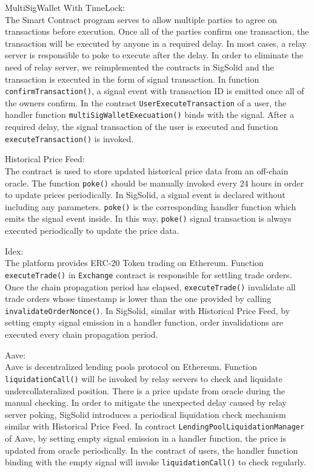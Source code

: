 \documentclass{article}
\newcommand{\sourcecode}[1]{\texttt{#1}}
\begin{document}
MultiSigWallet With TimeLock:\\
The Smart Contract program serves to allow multiple parties to agree on transactions before execution. 
Once all of the parties confirm one transaction, the transaction will be executed by anyone in a required delay.
In most cases, a relay server is responsible to poke to execute after the delay.
In order to eliminate the need of relay server, we reimplemented the contracts in SigSolid and the transaction is executed in the form of signal transaction.
In function \sourcecode{confirmTransaction()}, a signal event with transaction ID is emitted once all of the owners confirm.
In the contract \sourcecode{UserExecuteTransaction} of a user, the handler function \sourcecode{multiSigWalletExecuation()} binds with the signal.
After a required delay, the signal transaction of the user is executed and function \sourcecode{executeTransaction()} is invoked.

Historical Price Feed:\\
The contract is used to store updated historical price data from an off-chain oracle.
The function \sourcecode{poke()} should be manually invoked every 24 hours in order to update prices periodically.
In SigSolid, a signal event is declared without including any parameters. 
\sourcecode{poke()} is the corresponding handler function which emits the signal event inside.
In this way, \sourcecode{poke()} signal transaction is always executed periodically to update the price data.

Idex:\\
The platform provides ERC-20 Token trading on Ethereum. 
Function \sourcecode{executeTrade()} in \sourcecode{Exchange} contract is responsible for settling trade orders.
Once the chain propagation period has elapsed, \sourcecode{executeTrade()} invalidate all trade orders whose timestamp is lower than the one provided 
by calling \sourcecode{invalidateOrderNonce()}.
In SigSolid, similar with Historical Price Feed, 
by setting empty signal emission in a handler function, order invalidations are executed every chain propagation period.

Aave:\\
Aave is decentralized lending pools protocol on Ethereum. 
Function \sourcecode{liquidationCall()} will be invoked by relay servers
to check and liquidate undercollateralized position.
There is a price update from oracle during the manual checking.
In order to mitigate the unexpected delay caused by relay server poking,
SigSolid introduces a periodical liquidation check mechanism similar with 
Historical Price Feed.
In contract \sourcecode{LendingPoolLiquidationManager} of Aave,
by setting empty signal emission in a handler function, the price is updated from oracle periodically.
In the contract of users, the handler function binding with the empty signal will invoke
\sourcecode{liquidationCall()} to check regularly.
\end{document}
